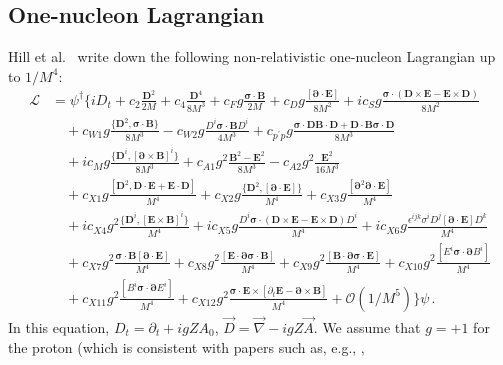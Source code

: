 \documentclass[prl,
twocolumn,
showpacs,preprintnumbers,amsmath,amssymb,
superscriptaddress,
a4paper,nofootinbib,longbibliography]{revtex4-2}
\def\nn{\nonumber}
\begin{document}
\subsection{One-nucleon Lagrangian}
Hill et al.~\cite{Hill:2012rh} write down the following non-relativistic one-nucleon
Lagrangian up to $1/M^4$:
\begin{align}
\mathcal{L} &= \psi^\dagger
  \bigg\{  i D_t  + c_2 \frac{\bm{D}^2 }{ 2M}  + c_4 \frac{\bm{D}^4 }{ 8 M^3} +
  c_F g\frac{ \bm{\sigma}\cdot \bm{B} }{ 2M}   
+ c_D g\frac{ [\bm{\partial}\cdot \bm{E}] }{ 8 M^2}  
+ i c_S g\frac{ \bm{\sigma} \cdot ( \bm{D} \times \bm{E} - \bm{E}\times \bm{D} ) }{ 8 M^2} 
\nn\\
&\quad
+ c_{W1}g \frac{  \{ \bm{D}^2 ,  \bm{\sigma}\cdot \bm{B} \}  }{ 8 M^3}  
- c_{W2}g \frac{  D^i \bm{\sigma}\cdot
    \bm{B} D^i }{ 4 M^3 }  + c_{p^\prime p} g \frac{ \bm{\sigma} \cdot
    \bm{D} \bm{B}\cdot \bm{D} + \bm{D}\cdot\bm{B} \bm{\sigma}\cdot \bm{D}
    }{  8 M^3} 
\nn\\
&\quad 
+ i c_M g \frac{ \{ \bm{D}^i ,  [\bm{\partial} \times \bm{B}]^i \} }{ 8 M^3}
+ c_{A1} g^2\frac{ \bm{B}^2 - \bm{E}^2 }{ 8 M^3}  - c_{A2} g^2\frac{ \bm{E}^2 }{ 16 M^3 } 
\nn \\
&\quad 
+ c_{X1}g \frac{ [ \bm{D}^2 , \bm{D}\cdot \bm{E} + \bm{E}\cdot\bm{D} ] }{ M^4 }
+ c_{X2}g \frac{ \{ \bm{D}^2 , [\bm{\partial}\cdot\bm{E}] \} }{ M^4 }
+ c_{X3}g \frac{ [\bm{\partial}^2 \bm{\partial}\cdot\bm{E}] }{ M^4 } 
\nn \\
&\quad 
+ i c_{X4}g^2 \frac{ \{ \bm{D}^i , [\bm{E}\times\bm{B}]^i \} }{ M^4 } 
+ ic_{X5} g \frac{ D^i \bm{\sigma}\cdot ( \bm{D}\times\bm{E} - \bm{E}\times\bm{D} )D^i   }{ M^4} 
+ ic_{X6} g \frac{ \epsilon^{ijk} \sigma^i D^j [\bm{\partial}\cdot\bm{E}] D^k }{ M^4} 
\nn \\
&\quad
+ c_{X7} g^2 \frac{ \bm{\sigma}\cdot\bm{B} [\bm{\partial}\cdot\bm{E}] }{ M^4} 
+ c_{X8} g^2 \frac{ [\bm{E}\cdot\bm{\partial} \bm{\sigma}\cdot\bm{B} ] }{ M^4}
+ c_{X9} g^2 \frac{ [\bm{B}\cdot\bm{\partial} \bm{\sigma}\cdot\bm{E} ] }{ M^4} 
+ c_{X10} g^2 \frac{ [E^i \bm{\sigma}\cdot\bm{\partial} B^i] }{ M^4}
\nn \\
&\quad
+ c_{X11} g^2 \frac{ [B^i \bm{\sigma}\cdot\bm{\partial} E^i]}{M^4} 
+ c_{X12} g^2 \frac{ \bm{\sigma}\cdot \bm{E}\times [{\partial_t}\bm{E}-\bm{\partial}\times\bm{B} ] }{ M^4}
+ \mathcal{O}(1/M^5)
 \bigg\} \psi  \,.
 \label{eq:abelian}
 \end{align}
In this equation, $D_t=\partial_t + i g Z A_0$, $\vec D=\vec\nabla - i g Z \vec A$.
We assume that $g=+1$ for the proton (which is consistent with papers such as, e.g., \cite{Dye:2016uep},
\end{document}

